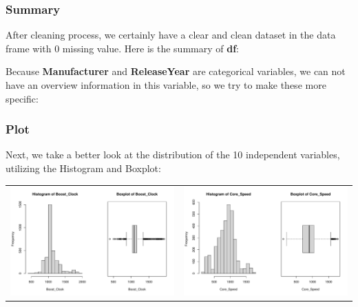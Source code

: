 \documentclass[a4paper]{article}
\theoremstyle{definition}
\begin{document}
\subsubsection{Summary}
After cleaning process, we certainly have a clear and clean dataset in the data frame with 0 missing value. Here is the summary of \textbf{df}:

Because \textbf{Manufacturer} and \textbf{Release\textunderscore Year} are categorical variables, we can not have an overview information in this variable, so we try to make these more specific:

\subsubsection{Plot}
Next, we take a better look at the distribution of the 10 independent variables, utilizing the Histogram and Boxplot:
\begin{center}
\begin{adjustbox}{width=\textwidth}
    \begin{tabular}{cc}
        \includegraphics[keepaspectratio, width=1\textwidth, height=1\textheight]{Visualization/Rplot_1.pdf}
        &\includegraphics[keepaspectratio, width=1\textwidth, height=1\textheight]{Visualization/Rplot_2.pdf}\\
    \end{tabular}
\end{adjustbox}
\end{center}
\end{document}
